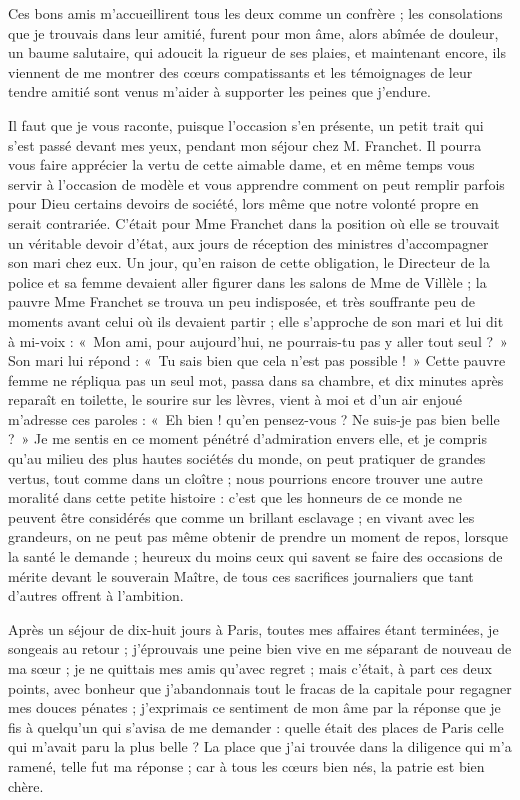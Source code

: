 \documentclass[11pt,a4paper]{report}
\begin{document}
Ces bons amis m'accueillirent tous les deux comme un confrère ; les consolations que je trouvais dans leur amitié, furent pour mon âme, alors abîmée de douleur, un baume salutaire, qui adoucit la rigueur de ses plaies, et maintenant encore, ils viennent de me montrer des cœurs compatissants et les témoignages de leur tendre amitié sont venus m'aider à supporter les peines que j'endure.

Il faut que je vous raconte, puisque l'occasion s'en présente, un petit trait qui s'est passé devant mes yeux, pendant mon séjour chez M. Franchet. Il pourra vous faire apprécier la vertu de cette aimable dame, et en même temps vous servir à l'occasion de modèle et vous apprendre comment on peut remplir parfois pour Dieu certains devoirs de société, lors même que notre volonté propre en serait contrariée. C'était pour Mme Franchet dans la position où elle se trouvait un véritable devoir d'état, aux jours de réception des ministres d'accompagner son mari chez eux. Un jour, qu'en raison de cette obligation, le Directeur de la police et sa femme devaient aller figurer dans les salons de Mme de Villèle ; la pauvre Mme Franchet se trouva un peu indisposée, et très souffrante peu de moments avant celui où ils devaient partir ; elle s'approche de son mari et lui dit à mi-voix : «~Mon ami, pour aujourd'hui, ne pourrais-tu pas y aller tout seul ?~» Son mari lui répond : «~Tu sais bien que cela n'est pas possible !~» Cette pauvre femme ne répliqua pas un seul mot, passa dans sa chambre, et dix minutes après reparaît en toilette, le sourire sur les lèvres, vient à moi et d'un air enjoué m'adresse ces paroles : «~Eh bien ! qu'en pensez-vous ? Ne suis-je pas bien belle ?~» Je me sentis en ce moment pénétré d'admiration envers elle, et je compris qu'au milieu des plus hautes sociétés du monde, on peut pratiquer de grandes vertus, tout comme dans un cloître ; nous pourrions encore trouver une autre moralité dans cette petite histoire : c'est que les honneurs de ce monde ne peuvent être considérés que comme un brillant esclavage ; en vivant avec les grandeurs, on ne peut pas même obtenir de prendre un moment de repos, lorsque la santé le demande ; heureux du moins ceux qui savent se faire des occasions de mérite devant le souverain Maître, de tous ces sacrifices journaliers que tant d'autres offrent à l'ambition.

Après un séjour de dix-huit jours à Paris, toutes mes affaires étant terminées, je songeais au retour ; j'éprouvais une peine bien vive en me séparant de nouveau de ma sœur ; je ne quittais mes amis qu'avec regret ; mais c'était, à part ces deux points, avec bonheur que j'abandonnais tout le fracas de la capitale pour regagner mes douces pénates ; j'exprimais ce sentiment de mon âme par la réponse que je fis à quelqu'un qui s'avisa de me demander : quelle était des places de Paris celle qui m'avait paru la plus belle ? La place que j'ai trouvée dans la diligence qui m'a ramené, telle fut ma réponse ; car à tous les cœurs bien nés, la patrie est bien chère.
\end{document}
